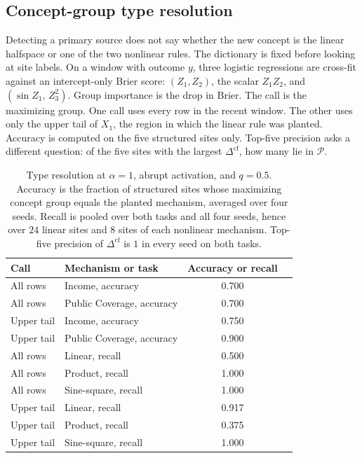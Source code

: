 \subsection{Concept-group type resolution}
\label{sec:type}

Detecting a primary source does not say whether the new concept is the
linear halfspace or one of the two nonlinear rules.
The dictionary is fixed before looking at site labels.
On a window with outcome $y$, three logistic regressions are cross-fit
against an intercept-only Brier score:
$(Z_1,Z_2)$, the scalar $Z_1 Z_2$, and $(\sin Z_1,\, Z_3^2)$.
Group importance is the drop in Brier.
The call is the maximizing group.
One call uses every row in the recent window.
The other uses only the upper tail of $X_1$, the region in which the
linear rule was planted.
Accuracy is computed on the five structured sites only.
Top-five precision asks a different question: of the five sites with the
largest $\Delta^{\mathrm{cf}}$, how many lie in $\mathcal{P}$.

\begin{table}[t]
\centering
\caption{Type resolution at $\alpha=1$, abrupt activation, and $q=0.5$.
Accuracy is the fraction of structured sites whose maximizing concept group
equals the planted mechanism, averaged over four seeds.
Recall is pooled over both tasks and all four seeds, hence over $24$ linear
sites and $8$ sites of each nonlinear mechanism.
Top-five precision of $\Delta^{\mathrm{cf}}$ is $1$ in every seed on both
tasks.}
\label{tab:type}
\begin{tabular}{llcc}
\toprule
Call & Mechanism or task & Accuracy or recall \\
\midrule
All rows & Income, accuracy & 0.700 \\
All rows & Public Coverage, accuracy & 0.700 \\
Upper tail & Income, accuracy & 0.750 \\
Upper tail & Public Coverage, accuracy & 0.900 \\
\midrule
All rows & Linear, recall & 0.500 \\
All rows & Product, recall & 1.000 \\
All rows & Sine-square, recall & 1.000 \\
Upper tail & Linear, recall & 0.917 \\
Upper tail & Product, recall & 0.375 \\
Upper tail & Sine-square, recall & 1.000 \\
\bottomrule
\end{tabular}
\end{table}

